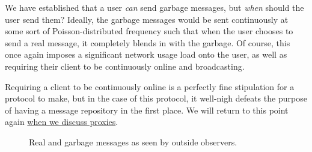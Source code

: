 We have established that a user \emph{can} send garbage messages, but \emph{when} should the user send them? Ideally, the garbage messages would be sent continuously at some sort of Poisson-distributed frequency such that when the user chooses to send a real message, it completely blends in with the garbage. Of course, this once again imposes a significant network usage load onto the user, as well as requiring their client to be continuously online and broadcasting.

Requiring a client to be continuously online is a perfectly fine stipulation for a protocol to make, but in the case of this protocol, it well-nigh defeats the purpose of having a message repository in the first place. We will return to this point again \hyperref[proxies]{when we discuss proxies}.

\begin{figure}[h!]
    \centering
    \caption{Real and garbage messages as seen by outside observers.}
    \label{fig:garbage_messages}
\end{figure}

